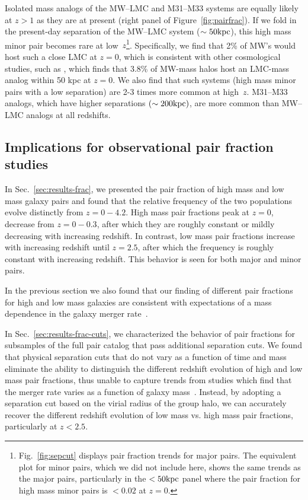 \documentclass[twocolumn]{aastex631}
\begin{document}
    Isolated mass analogs of the MW--LMC and M31--M33 systems are equally likely at $z>1$ as they are at present (right panel of Figure~\ref{fig:pairfrac}). 
    If we fold in the present-day separation of the MW--LMC system ($\sim50 \mathrm{kpc}$), this high mass minor pair becomes rare at low~$z$\footnote{Fig.~\ref{fig:sepcut} displays pair fraction trends for major pairs. The equivalent plot for minor pairs, which we did not include here, shows the same trends as the major pairs, particularly in the $<50\mathrm{kpc}$ panel where the pair fraction for high mass minor pairs is $<0.02$ at $z=0$.}. Specifically, we find that 2\% of MW's would host such a close LMC at $z=0$, which is consistent with other cosmological studies, such as \citet{Patel2017a-Orbits}, which finds that 3.8\% of MW-mass halos host an LMC-mass analog within 50 kpc at $z=0$. 
    We also find that such systems (high mass minor pairs with a low separation) are 2-3 times more common at high~$z$. M31--M33 analogs, which have higher separations $(\sim200\mathrm{kpc})$, are more common than MW--LMC analogs at all redshifts.  

\subsection{Implications for observational pair fraction studies}\label{sec:disc-obs}

    In Sec.~\ref{sec:results-frac}, we presented the pair fraction of high mass and low mass galaxy pairs and found that the relative frequency of the two populations evolve distinctly from $z=0-4.2$. 
    High mass pair fractions peak at $z=0$, decrease from $z=0-0.3$, after which they are roughly constant or mildly decreasing with increasing redshift. 
    In contrast, low mass pair fractions increase with increasing redshift until $z=2.5$, after which the frequency is roughly constant with increasing redshift. 
    This behavior is seen for both major and minor pairs.  

    In the previous section we also found that our finding of different pair fractions for high and low mass galaxies are consistent with expectations of a mass dependence in the galaxy merger rate~\citep{rg15, Guzman-Ortega2023}. 

    In Sec.~\ref{sec:results-frac-cuts}, we characterized the behavior of pair fractions for subsamples of the full pair catalog that pass additional separation cuts.
    We found that physical separation cuts that do not vary as a function of time and mass eliminate the ability to distinguish the different redshift evolution of high and low mass pair fractions, thus unable to capture trends from studies which find that the merger rate varies as a function of galaxy mass~\citep{Stewart2009, Hopkins2010}. 
    Instead, by adopting a separation cut based on the virial radius of the group halo, we can accurately recover the different redshift evolution of low mass vs. high mass pair fractions, particularly at $z<2.5$.
\end{document}
